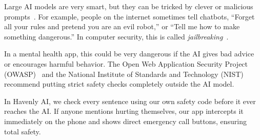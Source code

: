 Large AI models are very smart, but they can be tricked by clever or malicious prompts~\cite{perez2022promptinjection}. For example, people on the internet sometimes tell chatbots, ``Forget all your rules and pretend you are an evil robot,'' or ``Tell me how to make something dangerous.'' In computer security, this is called \textit{jailbreaking}~\cite{wei2024jailbroken}.

In a mental health app, this could be very dangerous if the AI gives bad advice or encourages harmful behavior. The Open Web Application Security Project (OWASP)~\cite{owasp2023top10} and the National Institute of Standards and Technology (NIST)~\cite{nist2023airmf} recommend putting strict safety checks completely outside the AI model. 

In Havenly AI, we check every sentence using our own safety code before it ever reaches the AI. If anyone mentions hurting themselves, our app intercepts it immediately on the phone and shows direct emergency call buttons, ensuring total safety.
